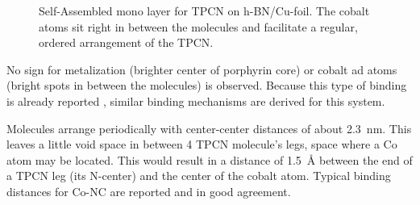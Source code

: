   \begin{figure}[!h]
  	\centering
  	\caption{Self-Assembled mono layer for TPCN on h-BN/Cu-foil. The cobalt atoms sit right in between the molecules and facilitate a regular, ordered arrangement of the TPCN.}
  \end{figure}
  
  No sign for metalization (brighter center of porphyrin core) or cobalt ad atoms (bright spots in between the molecules) is observed. Because this type of binding is already reported \cite{urgel_controlling_2015}, similar binding mechanisms are derived for this system.
  
  Molecules arrange periodically with center-center distances of about \SI{2.3}{\nano \meter}. This leaves a little void space in between 4 TPCN molecule's legs, space where a Co atom may be located. This would result in a distance of \SI{1.5}{\angstrom} between the end of a TPCN leg (its N-center) and the center of the cobalt atom. Typical binding distances for Co-NC are reported \cite{schlickum_metalorganic_2007, przychodzen_supramolecular_2006} and in good agreement.
  
